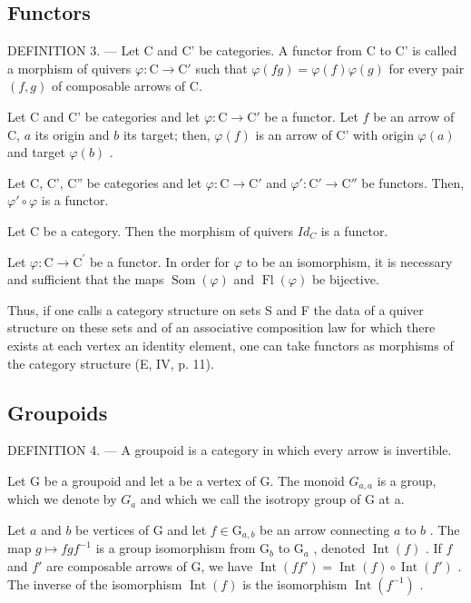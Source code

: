 \subsection{Functors}

DEFINITION 3. --- Let C and C' be categories. A functor from C to C' is called a morphism of quivers \(\varphi\colon\mathrm{C}\to\mathrm{C}'\) such that \(\varphi(fg)=\varphi(f)\varphi(g)\) for every pair \((f,g)\) of composable arrows of C.

Let C and C' be categories and let \(\varphi\colon\mathrm{C}\to\mathrm{C}'\) be a functor. Let \(f\) be an arrow of C, \(a\) its origin and \(b\) its target; then, \(\varphi(f)\) is an arrow of C' with origin \(\varphi(a)\) and target \(\varphi(b)\) .

Let C, C', C'' be categories and let \(\varphi\colon\mathrm{C}\to\mathrm{C}'\) and \(\varphi'\colon\mathrm{C}'\to\mathrm{C}''\) be functors. Then, \(\varphi'\circ\varphi\) is a functor.

Let C be a category. Then the morphism of quivers \(Id_{C}\) is a functor.

Let \(\varphi\colon\mathrm{C}\to\mathrm{C}^{\prime}\) be a functor. In order for \(\varphi\) to be an isomorphism, it is necessary and sufficient that the maps \(\operatorname{Som}(\varphi)\) and \(\operatorname{Fl}(\varphi)\) be bijective.

Thus, if one calls a category structure on sets S and F the data of a quiver structure on these sets and of an associative composition law for which there exists at each vertex an identity element, one can take functors as morphisms of the category structure (E, IV, p. 11).

\subsection{Groupoids}

DEFINITION 4. --- A groupoid is a category in which every arrow is invertible.

Let G be a groupoid and let a be a vertex of G. The monoid \(G_{a,a}\) is a group, which we denote by \(G_{a}\) and which we call the isotropy group of G at a.

Let \(a\) and \(b\) be vertices of G and let \(f \in \mathrm{G}_{a,b}\) be an arrow connecting \(a\) to \(b\) . The map \(g \mapsto fgf^{-1}\) is a group isomorphism from \(\mathrm{G}_b\) to \(\mathrm{G}_a\) , denoted \(\operatorname{Int}(f)\) . If \(f\) and \(f'\) are composable arrows of G, we have \(\operatorname{Int}(ff') = \operatorname{Int}(f) \circ \operatorname{Int}(f')\) . The inverse of the isomorphism \(\operatorname{Int}(f)\) is the isomorphism \(\operatorname{Int}(f^{-1})\) .

